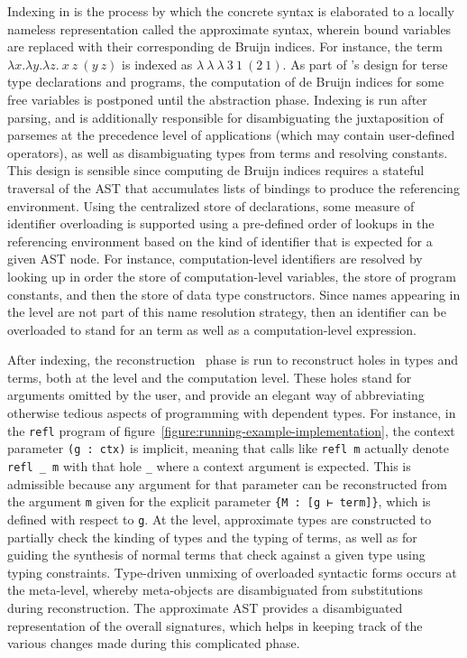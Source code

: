 Indexing in \Beluga is the process by which the concrete syntax is elaborated to a locally nameless representation called the approximate syntax, wherein bound variables are replaced with their corresponding de Bruijn indices.
For instance, the \LF term $\lambda x. \lambda y. \lambda z.\ x\ z\ (y\ z)$ is indexed as $\lambda\ \lambda\ \lambda\ 3\ 1\ (2\ 1)$.
As part of \Beluga's design for terse type declarations and programs, the computation of de Bruijn indices for some free variables is postponed until the abstraction phase.
Indexing is run after parsing, and is additionally responsible for disambiguating the juxtaposition of \LF parsemes at the precedence level of applications (which may contain user-defined operators), as well as disambiguating \LF types from terms and resolving constants.
This design is sensible since computing de Bruijn indices requires a stateful traversal of the \ac{AST} that accumulates lists of bindings to produce the referencing environment.
Using the centralized store of declarations, some measure of identifier overloading is supported using a pre-defined order of lookups in the referencing environment based on the kind of identifier that is expected for a given \ac{AST} node.
For instance, computation-level identifiers are resolved by looking up in order the store of computation-level variables, the store of program constants, and then the store of data type constructors.
Since names appearing in the \LF level are not part of this name resolution strategy, then an identifier can be overloaded to stand for an \LF term as well as a computation-level expression.

After indexing, the reconstruction~\cite{pientka2013insider} phase is run to reconstruct holes in types and terms, both at the \LF level and the computation level.
These holes stand for arguments omitted by the user, and provide an elegant way of abbreviating otherwise tedious aspects of programming with dependent types.
For instance, in the \verb|refl| program of figure~\ref{figure:running-example-implementation}, the context parameter \verb|(g : ctx)| is implicit, meaning that calls like \verb|refl m| actually denote \verb|refl _ m| with that hole \verb|_| where a context argument is expected.
This is admissible because any argument for that parameter can be reconstructed from the argument \verb|m| given for the explicit parameter \verb|{M : [g ⊢ term]}|, which is defined with respect to \verb|g|.
At the \LF level, approximate types are constructed to partially check the kinding of \LF types and the typing of \LF terms, as well as for guiding the synthesis of normal terms that check against a given type using typing constraints.
Type-driven unmixing of overloaded syntactic forms occurs at the meta-level, whereby meta-objects are disambiguated from substitutions during reconstruction.
The approximate \ac{AST} provides a disambiguated representation of the overall \Beluga signatures, which helps in keeping track of the various changes made during this complicated phase.

